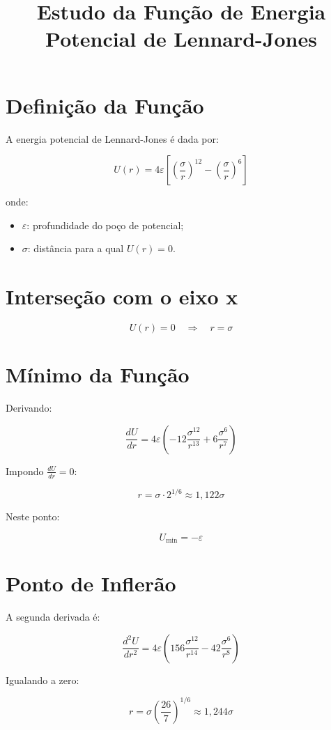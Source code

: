 \documentclass[12pt,a4paper]{article}
\title{Estudo da Função de Energia Potencial de Lennard-Jones}
\author{}
\date{}
\begin{document}
\maketitle

\section{Definição da Função}

A energia potencial de Lennard-Jones é dada por:

\[
U(r) = 4\varepsilon \left[ \left( \frac{\sigma}{r} \right)^{12} - \left( \frac{\sigma}{r} \right)^6 \right]
\]

onde:
\begin{itemize}
    \item $\varepsilon$: profundidade do poço de potencial;
    \item $\sigma$: distância para a qual $U(r)=0$.
\end{itemize}


\section{Interseção com o eixo x}

\[
U(r) = 0 \quad \Rightarrow \quad r = \sigma
\]


\section{Mínimo da Função}

Derivando:

\[
\frac{dU}{dr} = 4\varepsilon \left( -12 \frac{\sigma^{12}}{r^{13}} + 6 \frac{\sigma^6}{r^7} \right)
\]

Impondo $\frac{dU}{dr}=0$:

\[
r = \sigma \cdot 2^{1/6} \approx 1,122\sigma
\]

Neste ponto:

\[
U_{\min} = -\varepsilon
\]


\section{Ponto de Inflerão}

A segunda derivada é:

\[
\frac{d^2U}{dr^2} = 4\varepsilon \left( 156 \frac{\sigma^{12}}{r^{14}} - 42 \frac{\sigma^6}{r^8} \right)
\]

Igualando a zero:

\[
r = \sigma \left( \frac{26}{7} \right)^{1/6} \approx 1,244\sigma
\]
\end{document}
